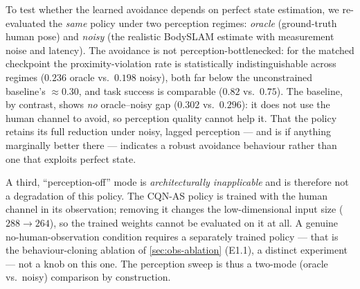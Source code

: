 To test whether the learned avoidance depends on perfect state estimation, we
re-evaluated the \emph{same} policy under two perception regimes: \emph{oracle}
(ground-truth human pose) and \emph{noisy} (the realistic BodySLAM estimate with
measurement noise and latency). The avoidance is not perception-bottlenecked: for
the matched checkpoint the proximity-violation rate is statistically
indistinguishable across regimes ($0.236$ oracle vs.\ $0.198$ noisy), both far
below the unconstrained baseline's $\approx\!0.30$, and task success is comparable
($0.82$ vs.\ $0.75$). The baseline, by contrast, shows \emph{no} oracle--noisy gap
($0.302$ vs.\ $0.296$): it does not use the human channel to avoid, so perception
quality cannot help it. That the policy retains its full reduction under noisy,
lagged perception --- and is if anything marginally better there --- indicates a
robust avoidance behaviour rather than one that exploits perfect state.

A third, ``perception-off'' mode is \emph{architecturally inapplicable} and is
therefore not a degradation of this policy. The CQN-AS policy is trained with the
human channel in its observation; removing it changes the low-dimensional input
size ($288 \to 264$), so the trained weights cannot be evaluated on it at all. A
genuine no-human-observation condition requires a separately trained policy ---
that is the behaviour-cloning ablation of \cref{sec:obs-ablation} (E1.1), a
distinct experiment --- not a knob on this one. The perception sweep is thus a
two-mode (oracle vs.\ noisy) comparison by construction.
